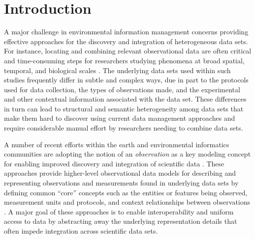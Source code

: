 
\section{Introduction}
\label{sec-intro}

A major challenge in environmental information management concerns
providing effective approaches for the discovery and integration of
heterogeneous data sets. For instance, locating and combining relevant
observational data are often critical and time-consuming steps for
researchers studying phenomena at broad spatial, temporal, and
biological scales
\cite{worm06:_impac_of_biodiv_loss_ocean_ecosy_servic,pennings05:_do,green05:_compl_in_ecolog_and_conser,sorokina09:_detec_inter_variab_inter_obser_ornit_data,jackson01:_histor_overf_and_recen_collap}. The
underlying data sets used within such studies frequently differ in
subtle and complex ways, due in part to the protocols used for data
collection, the types of observations made, and the experimental and
other contextual information associated with the data set. These
differences in turn can lead to structural and semantic heterogeneity
among data sets that make them hard to discover using current data
management approaches and require considerable manual effort by
researchers needing to combine data sets.

A number of recent efforts within the earth and environmental
informatics communities are adopting the notion of an \emph{observation} as a
key modeling concept for enabling improved discovery and integration
of scientific data
\cite{om,fox09:_ontol,tarboton07:_cuahs_commun_obser_data_model,cushing07:_compon_based_end_user_datab,balhoff10:_phenex,bowers08}. These
approaches provide higher-level observational data models for
describing and representing observations and measurements found in
underlying data sets by defining common ``core'' concepts such as the
entities or features being observed, measurement units and protocols,
and context relationships between observations \cite{om,bowers08}.  A
major goal of these approaches is to enable interoperability and
uniform access to data by abstracting away the underlying
representation details that often impede integration across scientific data sets.

